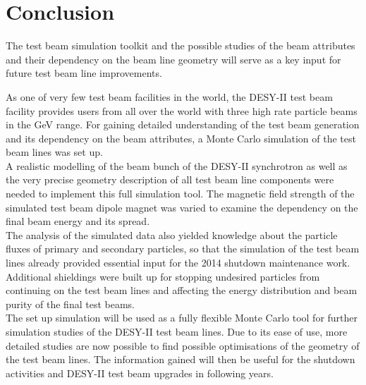 \section{Conclusion}
 The test beam simulation toolkit and the possible studies of the beam attributes and their dependency on the beam line geometry will serve as a key input for future test beam line improvements.
 
 As one of very few test beam facilities in the world, the DESY-II test beam facility provides users from all over the world with three high rate particle beams in the GeV range. For gaining detailed understanding of the test beam generation and its dependency on the beam attributes, a \geant Monte Carlo simulation of the test beam lines was set up.\\
A realistic modelling of the beam bunch of the DESY-II synchrotron as well as the very precise geometry description of all test beam line components were needed to implement this full simulation tool. The magnetic field strength of the simulated test beam dipole magnet was varied to examine the dependency on the final beam energy and its spread.\\
The analysis of the simulated data also yielded knowledge about the particle fluxes of primary and secondary particles, so that the  simulation of the test beam lines already provided essential input for the 2014 shutdown maintenance work. Additional shieldings were built up for stopping undesired particles from continuing on the test beam lines and affecting the energy distribution and beam purity of the final test beams.\\
The set up simulation will be used as a fully flexible \geant Monte Carlo tool for further simulation studies of the DESY-II test beam lines. Due to its ease of use, more detailed studies are now possible to find possible optimisations of the geometry of the test beam lines. The information gained will then be useful for the shutdown activities and DESY-II test beam upgrades in following years. 